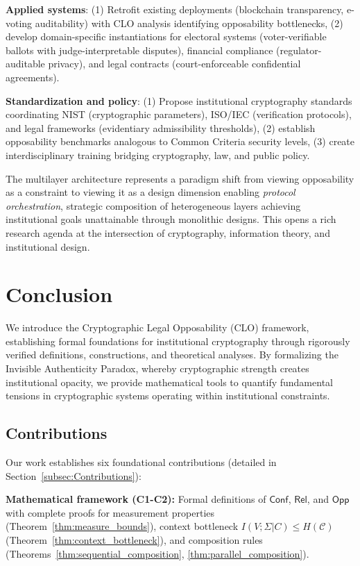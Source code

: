 \documentclass{ieeeaccess}
\begin{document}
\textbf{Applied systems}: (1) Retrofit existing deployments (blockchain transparency, e-voting auditability) with CLO analysis identifying opposability bottlenecks, (2) develop domain-specific instantiations for electoral systems (voter-verifiable ballots with judge-interpretable disputes), financial compliance (regulator-auditable privacy), and legal contracts (court-enforceable confidential agreements).

\textbf{Standardization and policy}: (1) Propose institutional cryptography standards coordinating NIST (cryptographic parameters), ISO/IEC (verification protocols), and legal frameworks (evidentiary admissibility thresholds), (2) establish opposability benchmarks analogous to Common Criteria security levels, (3) create interdisciplinary training bridging cryptography, law, and public policy.

The multilayer architecture represents a paradigm shift from viewing opposability as a constraint to viewing it as a design dimension enabling \emph{protocol orchestration}, strategic composition of heterogeneous layers achieving institutional goals unattainable through monolithic designs. This opens a rich research agenda at the intersection of cryptography, information theory, and institutional design.

\section{Conclusion}\label{sec:conclusion}

We introduce the Cryptographic Legal Opposability (CLO) framework, establishing formal foundations for institutional cryptography through rigorously verified definitions, constructions, and theoretical analyses. By formalizing the Invisible Authenticity Paradox, whereby cryptographic strength creates institutional opacity, we provide mathematical tools to quantify fundamental tensions in cryptographic systems operating within institutional constraints.

\subsection{Contributions}

Our work establishes six foundational contributions (detailed in Section~\ref{subsec:Contributions}):

\textbf{Mathematical framework (C1-C2):} Formal definitions of $\mathsf{Conf}$, $\mathsf{Rel}$, and $\mathsf{Opp}$ with complete proofs for measurement properties (Theorem~\ref{thm:measure_bounds}), context bottleneck $I(V;\Sigma|C) \leq H(\mathcal{C})$ (Theorem~\ref{thm:context_bottleneck}), and composition rules (Theorems~\ref{thm:sequential_composition}, \ref{thm:parallel_composition}).
\end{document}
